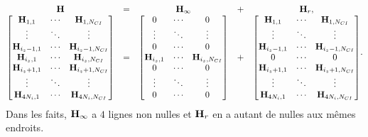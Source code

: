 \begin{equation*}
  \begin{matrix}
    {\mathbf{H}} &=& {\mathbf{H}}_\infty &+& {\mathbf{H}}_r,
    \\
    \begin{bmatrix}
      {\mathbf{H}}_{1,1} & \cdots & {\mathbf{H}}_{1,N_{CI}}
      \\
      \vdots & \ddots & \vdots
      \\
      {\mathbf{H}}_{i_z-1,1} & \cdots & {\mathbf{H}}_{i_z-1,N_{CI}}
      \\
      {\mathbf{H}}_{i_z,1} & \cdots & {\mathbf{H}}_{i_z,N_{CI}}
      \\
      {\mathbf{H}}_{i_z+1,1} & \cdots & {\mathbf{H}}_{i_z+1,N_{CI}}
      \\
      \vdots & \ddots & \vdots
      \\
      {\mathbf{H}}_{4N_i,1} & \cdots & {\mathbf{H}}_{4N_i,N_{CI}}
    \end{bmatrix}
    & = &
    \begin{bmatrix}
      0 & \cdots & 0
      \\
      \vdots & \ddots & \vdots
      \\
      0 & \cdots & 0
      \\
      {\mathbf{H}}_{i_z,1} & \cdots & {\mathbf{H}}_{i_z,N_{CI}}
      \\
      0 & \cdots & 0
      \\
      \vdots & \ddots & \vdots
      \\
      0 & \cdots & 0
    \end{bmatrix}
    & + & 
    \begin{bmatrix}
      {\mathbf{H}}_{1,1} & \cdots & {\mathbf{H}}_{1,N_{CI}}
      \\
      \vdots & \ddots & \vdots
      \\
      {\mathbf{H}}_{i_z-1,1} & \cdots & {\mathbf{H}}_{i_z-1,N_{CI}}
      \\
      0 & \cdots & 0
      \\
      {\mathbf{H}}_{i_z+1,1} & \cdots & {\mathbf{H}}_{i_z+1,N_{CI}}
      \\
      \vdots & \ddots & \vdots
      \\
      {\mathbf{H}}_{4N_i,1} & \cdots & {\mathbf{H}}_{4N_i,N_{CI}}
    \end{bmatrix}
  \end{matrix}.
\end{equation*}
Dans les faits, \({\mathbf{H}}_\infty\) a \(4\) lignes non nulles et \({\mathbf{H}}_r\) en a autant de nulles aux mêmes endroits.


